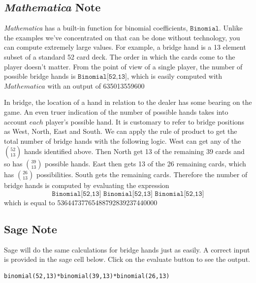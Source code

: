 \documentclass[10pt,]{book}
\theoremstyle{plain}
\theoremstyle{definition}
\begin{document}
\subsection[ \emph{Mathematica}  Note]{ \emph{Mathematica}  Note}\label{mathematica-binomial}
\emph{Mathematica}  has a built-in function for binomial coefficients, \(\texttt{Binomial}\). Unlike the examples we've concentrated on that can be done without technology, you can compute extremely large values. For 
example, a bridge hand is a 13 element subset of a standard 52 card deck. The order in which the cards come to the player doesn't matter. From the point of view of a single player, the number of possible bridge hands is \(\texttt{Binomial[52,13]}\), which is easily computed with \(Mathematica\) with an output of 635013559600%
\par
In bridge, the location of a hand in relation to the dealer has some bearing on the game. An even truer indication of the number of possible hands takes into account \(each\)  player's possible hand. It is customary 
to refer to bridge positions as West, North, East and South. We can apply the rule of product to get the total number of bridge hands with the following logic. West can get any of the \(\binom{52}{13}\) hands identified above. Then North get 13 of the remaining 39 cards and so has  \(\binom{39}{13}\) possible hands. East then gets 13 of the 26 remaining cards, which has \(\binom{26}{13}\)  possibilities. South gets the remaining cards. Therefore the number of bridge hands is computed by evaluating the expression \[\texttt{Binomial[52,13] Binomial[52,13] Binomial[52,13]}\] which is equal to 53644737765488792839237440000%
\typeout{************************************************}
\typeout{************************************************}
\subsection[Sage Note]{Sage Note}\label{sage-bridge-hands}

 Sage will do the same calculations for bridge hands just as easily. A correct input is provided in the sage cell below.  Click on the evaluate button to see the output.
%
\begin{lstlisting}[style=sageinput]
binomial(52,13)*binomial(39,13)*binomial(26,13)
\end{lstlisting}
\typeout{************************************************}
\typeout{************************************************}
\end{document}
